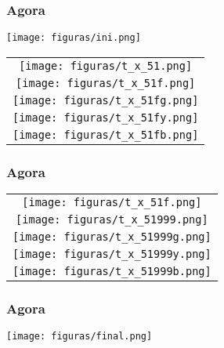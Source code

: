 \documentclass[xcolor=dvipsnames,10pt,aspectratio=169]{beamer}
\begin{document}
		\begin{frame}
			\frametitle{Agora}
			\centering
			{\texttt{[image: figuras/ini.png]}}
			\begin{tabular}{c}
				
				{\texttt{[image: figuras/t\_x\_51.png]}}\\{\texttt{[image: figuras/t\_x\_51f.png]}}\\{\texttt{[image: figuras/t\_x\_51fg.png]}}\\{\texttt{[image: figuras/t\_x\_51fy.png]}}\\{\texttt{[image: figuras/t\_x\_51fb.png]}}\\
				
			\end{tabular}
			
		\end{frame}
		
		\begin{frame}
			\frametitle{Agora}
			\centering
			\begin{tabular}{c}
				
				{\texttt{[image: figuras/t\_x\_51f.png]}}\\{\texttt{[image: figuras/t\_x\_51999.png]}}\\{\texttt{[image: figuras/t\_x\_51999g.png]}}\\{\texttt{[image: figuras/t\_x\_51999y.png]}}\\{\texttt{[image: figuras/t\_x\_51999b.png]}}
				
			\end{tabular}
			
		\end{frame}

		
		\begin{frame}
			\frametitle{Agora}
			\centering
			\texttt{[image: figuras/final.png]}

		\end{frame}
		
\end{document}
